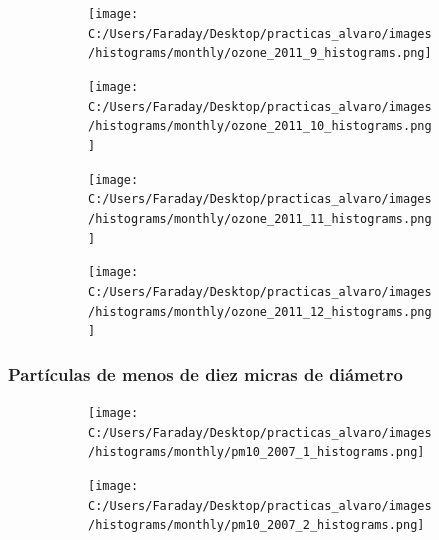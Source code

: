 \documentclass[12pt]{article}
\begin{document}
\begin{figure}[H]
\centering
\begin{subfigure}[h]{0.45\textwidth}
\texttt{[image: C:/Users/Faraday/Desktop/practicas\_alvaro/images/histograms/monthly/ozone\_2011\_9\_histograms.png]}
\caption{}
\label{fig:hist-mon-2-9-2011}
\end{subfigure}
%
\begin{subfigure}[H]{0.45\textwidth}
\texttt{[image: C:/Users/Faraday/Desktop/practicas\_alvaro/images/histograms/monthly/ozone\_2011\_10\_histograms.png]}
\caption{}
\label{fig:hist-mon-2-10-2011}
\end{subfigure}
\caption{}
\end{figure}

\begin{figure}[H]
\centering
\begin{subfigure}[h]{0.45\textwidth}
\texttt{[image: C:/Users/Faraday/Desktop/practicas\_alvaro/images/histograms/monthly/ozone\_2011\_11\_histograms.png]}
\caption{}
\label{fig:hist-mon-2-11-2011}
\end{subfigure}
%
\begin{subfigure}[H]{0.45\textwidth}
\texttt{[image: C:/Users/Faraday/Desktop/practicas\_alvaro/images/histograms/monthly/ozone\_2011\_12\_histograms.png]}
\caption{}
\label{fig:hist-mon-2-12-2011}
\end{subfigure}
\caption{}
\end{figure}

\newpage

\subsubsection*{Partículas de menos de diez micras de diámetro}
%

\begin{figure}[H]
\centering
\begin{subfigure}[h]{0.45\textwidth}
\texttt{[image: C:/Users/Faraday/Desktop/practicas\_alvaro/images/histograms/monthly/pm10\_2007\_1\_histograms.png]}
\caption{}
\label{fig:hist-mon-3-1-2007}
\end{subfigure}
%
\begin{subfigure}[H]{0.45\textwidth}
\texttt{[image: C:/Users/Faraday/Desktop/practicas\_alvaro/images/histograms/monthly/pm10\_2007\_2\_histograms.png]}
\caption{}
\label{fig:hist-mon-3-2-2007}
\end{subfigure}
\caption{}
\end{figure}
\end{document}

